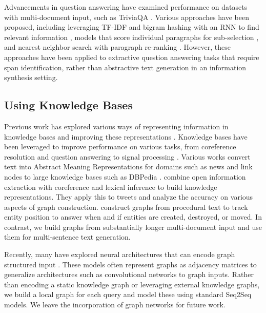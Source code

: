 \documentclass[11pt,a4paper]{article}
\begin{document}
Advancements in question answering have examined performance on datasets with multi-document input, such as TriviaQA \cite{joshi2017triviaqa}. Various approaches have been proposed, including leveraging TF-IDF and bigram hashing with an RNN to find relevant information \cite{chen2017reading}, models that score individual paragraphs for sub-selection \cite{clark2017simple}, and nearest neighbor search with paragraph re-ranking \cite{das2018multi}. However, these approaches have been applied to extractive question answering tasks that require span identification, rather than abstractive text generation in an information synthesis setting. 

\subsection{Using Knowledge Bases}

Previous work has explored various ways of representing information in knowledge bases \cite{bordes2011learning} and improving these representations \cite{chen2013learning}. Knowledge bases have been leveraged to improve performance on various tasks, from coreference resolution \cite{ng2002improving} and question answering \cite{zheng2003question,bao2014knowledge,cui2017kbqa,sun2018open} to signal processing \cite{buckner2002knowledge}. Various works convert text into Abstract Meaning Representations \cite{liu2018toward} for domains such as news \cite{vossen2015storylines,rospocher2016building} and link nodes to large knowledge bases such as DBPedia \cite{auer2007dbpedia}.  \citet{wities2017consolidated} combine open information extraction with coreference and lexical inference to build knowledge representations. They apply this to tweets and analyze the accuracy on various aspects of graph construction. \citet{das2018building} construct graphs from procedural text to track entity position to answer when and if entities are created, destroyed, or moved. In contrast, we build graphs from substantially longer multi-document input and use them for multi-sentence text generation.

Recently, many have explored neural architectures that can encode graph structured input \cite{bruna2013spectral,kipf2016semi,beck2018graph,zhou2018graph,xu2018graph2seq,lai2019lattice}. These models often represent graphs as adjacency matrices to generalize architectures such as convolutional networks to graph inputs. Rather than encoding a static knowledge graph or leveraging external knowledge graphs, we build a local graph for each query and model these using standard Seq2Seq models. We leave the incorporation of graph networks for future work. 
\end{document}
